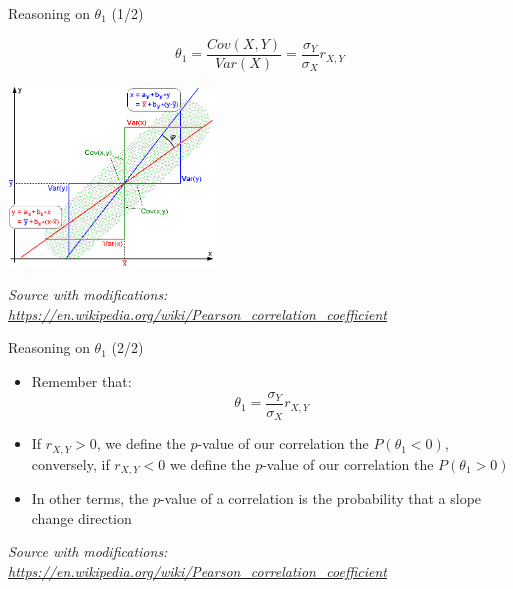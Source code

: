 \documentclass{beamer}
\begin{document}
\begin{frame}
{\centerline{Reasoning on $\theta_1$ (1/2)}}

$$ \theta_1  = \frac{Cov(X,Y)}{Var(X)} = \frac{\sigma_Y}{\sigma_X} r_{X,Y}$$
\begin{center}
\includegraphics[width=5.5cm]{P2023.AIBCCSS.InferenceAndLogisticRegression/Regression_lines.png}
\end{center} 

\textit{\tiny
\vspace{-\baselineskip}
Source with modifications: \url{https://en.wikipedia.org/wiki/Pearson_correlation_coefficient}}

\end{frame}

\begin{frame}
{\centerline{Reasoning on $\theta_1$ (2/2)}}

\begin{itemize}
\item Remember that:
$$ \theta_1  = \frac{\sigma_Y}{\sigma_X} r_{X,Y}   $$
\item If $r_{X,Y} > 0$, we define the $p$-value of our correlation the $P( \theta_1 < 0)$, conversely, if $r_{X,Y} < 0$ we define the $p$-value of our correlation the $P( \theta_1 > 0)$
\item In other terms, the $p$-value of a correlation is the probability that a slope change direction
\end{itemize}

\textit{\tiny
\vspace{-\baselineskip}
Source with modifications: \url{https://en.wikipedia.org/wiki/Pearson_correlation_coefficient}}

\end{frame}
\end{document}
